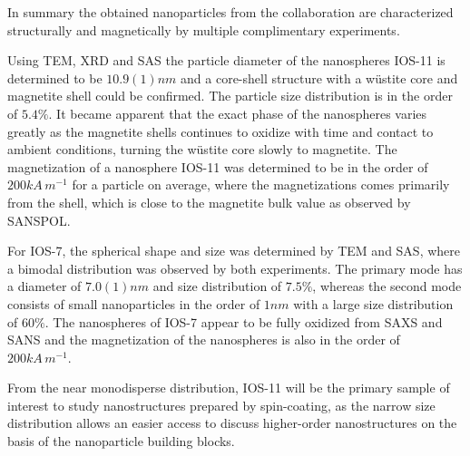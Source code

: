 \documentclass[\main/dresen_thesis.tex]{subfiles}
\begin{document}
  \label{sec:looselyPackedNS:nanoparticle:discussion:summary}
  In summary the obtained nanoparticles from the collaboration are characterized structurally and magnetically by multiple complimentary experiments.

  Using TEM, XRD and SAS the particle diameter of the nanospheres IOS-11 is determined to be $10.9(1) \unit{nm}$ and a core-shell structure with a w\"ustite core and magnetite shell could be confirmed.
  The particle size distribution is in the order of $5.4 \unit{\%}$.
  It became apparent that the exact phase of the nanospheres varies greatly as the magnetite shells continues to oxidize with time and contact to ambient conditions, turning the w\"ustite core slowly to magnetite.
  The magnetization of a nanosphere IOS-11 was determined to be in the order of $200 \unit{kA \, m^{-1}}$ for a particle on average, where the magnetizations comes primarily from the shell, which is close to the magnetite bulk value as observed by SANSPOL.

  For IOS-7, the spherical shape and size was determined by TEM and SAS, where a bimodal distribution was observed by both experiments.
  The primary mode has a diameter of $7.0(1) \unit{nm}$ and size distribution of $7.5 \unit{\%}$, whereas the second mode consists of small nanoparticles in the order of $1 \unit{nm}$ with a large size distribution of $60 \%$.
  The nanospheres of IOS-7 appear to be fully oxidized from SAXS and SANS and the magnetization of the nanospheres is also in the order of $200 \unit{kA \, m^{-1}}$.

  From the near monodisperse distribution, IOS-11 will be the primary sample of interest to study nanostructures prepared by spin-coating, as the narrow size distribution allows an easier access to discuss higher-order nanostructures on the basis of the nanoparticle building blocks.
\end{document}
